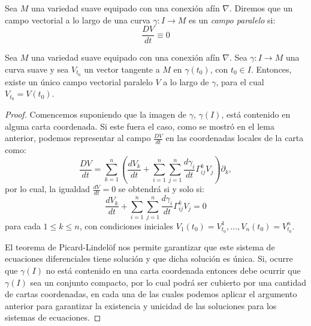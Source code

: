 \begin{definition}
  Sea $M$ una variedad suave equipado con una conexión afín $\nabla$. Diremos que un campo vectorial a lo largo de una curva $\gamma: I \to M$ es un \textit{campo paralelo} si:
  \[
    \frac{DV}{dt} \equiv 0
  \]
\end{definition}

\begin{theorem}\label{Teorema: Existencia y Unicidad de Campos Paralelos}
  Sea $M$ una variedad suave equipado con una conexión afín $\nabla$. Sea $\gamma: I \to M$ una curva suave y sea $V_{t_{0}}$ un vector tangente a $M$ en $\gamma(t_{0})$, con $t_{0} \in I$. Entonces, existe un único campo vectorial paralelo $V$ a lo largo de $\gamma$, para el cual $V_{t_{0}} = V(t_{0})$.
\end{theorem}

\begin{proof}
  Comencemos suponiendo que la imagen de $\gamma$, $\gamma(I)$, está contenido en alguna carta coordenada. Si este fuera el caso, como se mostró en el lema anterior, podemos representar al campo $\frac{DV}{dt}$ en las coordenadas locales de la carta como:
	\[
		\frac{DV}{dt} = \sum_{k=1}^{n} \left(\frac{dV_{k}}{dt}
		+ \sum_{i=1}^{n}\sum_{j=1}^{n} \frac{d\gamma_{i}}{dt} \Gamma_{ij}^{k} V_{j}\right) \partial_{k},
	\]
  por lo cual, la igualdad $\frac{dV}{dt} = 0$ se obtendrá si y solo si:
  \[
    \frac{d V_{k}}{dt} + \sum_{i=1}^{n}\sum_{j=1}^{n} \frac{d\gamma_{i}}{dt} \Gamma_{ij}^{k} V_{j} = 0
  \]
  para cada $1 \leq k \leq n$, con condiciones iniciales $V_{1}(t_{0}) = V^{1}_{t_{0}}, \ldots, V_{n}(t_{0}) = V^{n}_{t_0}$. 

  El teorema de Picard-Lindelöf nos permite garantizar que este sistema de ecuaciones diferenciales tiene solución y que dicha solución es única. Si, ocurre que $\gamma(I)$ no está contenido en una carta coordenada entonces debe ocurrir que $\gamma(I)$ sea un conjunto compacto, por lo cual podrá ser cubierto por una cantidad de cartas coordenadas, en cada una de las cuales podemos aplicar el argumento anterior para garantizar la existencia y unicidad de las soluciones para los sistemas de ecuaciones.
\end{proof}
